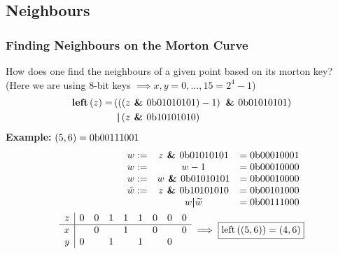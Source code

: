 \subsection{Neighbours}
\begin{frame}
    \frametitle{Finding Neighbours on the Morton Curve}
    How does one find the neighbours of a given point based on its morton key?
    \\ (Here we are using 8-bit keys $\implies x, y = 0, \dots, 15 = 2^4-1$)
    \begin{align}
        \textrm{\textbf{left}}\left(z\right) =& \left(\left(\left(
            z \textrm{\textbf{ \& }} 0\textrm{b}01010101 \right) - 1 \right) \textrm{\textbf{ \& }} 0\textrm{b}01010101 \right)
            \nonumber \\
            &\;\,\textrm{\textbf{\textbar }} \left( z \textrm{\textbf{ \& }} 0\textrm{b}10101010 \right)
    \end{align}
    \textbf{Example:} $\left( 5, 6 \right) = 0\textrm{b}00111001$
    \begin{align}
        \begin{array}{c c c}
            w :=& z \textrm{\textbf{ \& }} 0\textrm{b}01010101 &= 0\textrm{b}00010001 \\
            w :=& w - 1 &= 0\textrm{b}00010000 \\
            w :=& w \textrm{\textbf{ \& }} 0\textrm{b}01010101 &= 0\textrm{b}00010000 \\
            \tilde{w} :=& z \textrm{\textbf{ \& }} 0\textrm{b}10101010 &= 0\textrm{b}00101000 \\
            & w \textrm{\textbf{\textbar }} \widetilde{w} &= 0\textrm{b}00111000
        \end{array} \\
        \begin{array}{c | c c c c c c c c}
            z & 0 & 0 & 1 & 1 & 1 & 0 & 0 & 0 \\
            \hline
            x & & 0 & & 1 & & 0 & & 0 \\
            y & 0 & & 1 & & 1 & & 0 \\
        \end{array}
        \implies \boxed{\textrm{left}\left(\left(5, 6\right)\right) =
        \left(4, 6\right)}
    \end{align}
\end{frame}

